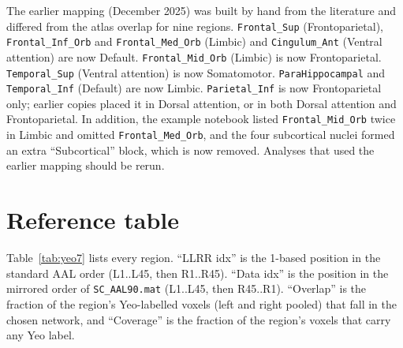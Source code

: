 \documentclass[a4paper,10pt]{article}
\newcommand{\aal}[1]{\texttt{#1}}
\begin{document}
The earlier mapping (December 2025) was built by hand from the literature and differed from the atlas overlap for nine regions.
\aal{Frontal\_Sup} (Frontoparietal), \aal{Frontal\_Inf\_Orb} and \aal{Frontal\_Med\_Orb} (Limbic) and \aal{Cingulum\_Ant} (Ventral attention) are now Default.
\aal{Frontal\_Mid\_Orb} (Limbic) is now Frontoparietal.
\aal{Temporal\_Sup} (Ventral attention) is now Somatomotor.
\aal{ParaHippocampal} and \aal{Temporal\_Inf} (Default) are now Limbic.
\aal{Parietal\_Inf} is now Frontoparietal only; earlier copies placed it in Dorsal attention, or in both Dorsal attention and Frontoparietal.
In addition, the example notebook listed \aal{Frontal\_Mid\_Orb} twice in Limbic and omitted \aal{Frontal\_Med\_Orb}, and the four subcortical nuclei formed an extra ``Subcortical'' block, which is now removed.
Analyses that used the earlier mapping should be rerun.

\section*{Reference table}

Table~\ref{tab:yeo7} lists every region.
``LLRR idx'' is the 1-based position in the standard AAL order (L1..L45, then R1..R45).
``Data idx'' is the position in the mirrored order of \texttt{SC\_AAL90.mat} (L1..L45, then R45..R1).
``Overlap'' is the fraction of the region's Yeo-labelled voxels (left and right pooled) that fall in the chosen network, and ``Coverage'' is the fraction of the region's voxels that carry any Yeo label.
\end{document}
